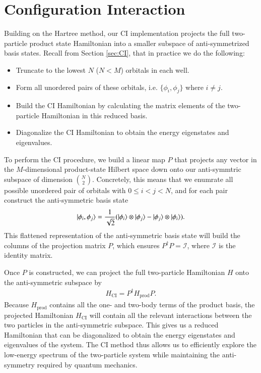 \documentclass{subfiles}
\begin{document}
\section{Configuration Interaction}\label{sec:CI_method}
Building on the Hartree method, our CI implementation projects the full two-particle product state Hamiltonian into a smaller subspace of anti-symmetrized basis states. Recall from Section \ref{sec:CI}, that in practice we do the following:
\begin{itemize}
    \item Truncate to the lowest $N$ ($N<M$) orbitals in each well.
    \item Form all unordered pairs of these orbitals, i.e. $\{\phi_i, \phi_j\}$ where $i \neq j$.
    \item Build the CI Hamiltonian by calculating the matrix elements of the two-particle Hamiltonian in this reduced basis.
    \item Diagonalize the CI Hamiltonian to obtain the energy eigenstates and eigenvalues.
\end{itemize}
To perform the CI procedure, we build a linear map $P$ that projects any vector in the $M$-dimensional product-state Hilbert space down onto our anti-symmtric subspace of dimension $\binom{N}{2}$. Concretely, this means that we enumrate all possible unordered pair of orbitals with $0\leq i < j < N$, and for each pair construct the anti-symmetric basis state
\begin{align*}
    \ket{\phi_i, \phi_j} = \frac{1}{\sqrt{2}}(\ket{\phi_i}\otimes\ket{\phi_j} - \ket{\phi_j}\otimes\ket{\phi_i}).
\end{align*}
This flattened representation of the anti-symmetric basis state will build the columns of the projection matrix $P$, which ensures $P^\dagger P = \mathcal{I}$, where $\mathcal{I}$ is the identity matrix. 

Once $P$ is constructed, we can project the full two-particle Hamiltonian $H$ onto the anti-symmetric subspace by
\begin{align*}
    H_{\text{CI}} = P^\dagger H_{\text{prod}} P.
\end{align*}
Because $H_{\text{prod}}$ contains all the one- and two-body terms of the product basis, the projected Hamiltonian $H_{\text{CI}}$ will contain all the relevant interactions between the two particles in the anti-symmetric subspace. This gives us a reduced Hamiltonian that can be diagonalized to obtain the energy eigenstates and eigenvalues of the system. The CI method thus allows us to efficiently explore the low-energy spectrum of the two-particle system while maintaining the anti-symmetry required by quantum mechanics. 
\end{document}
